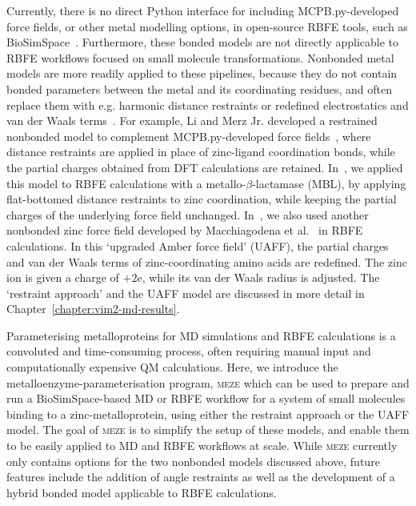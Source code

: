 Currently, there is no direct Python interface for including MCPB.py-developed force fields, or other metal modelling options, in open-source RBFE tools, such as BioSimSpace~\cite{hedges_biosimspace_2019}. Furthermore, these bonded models are not directly applicable to RBFE workflows focused on small molecule transformations. Nonbonded metal models are more readily applied to these pipelines, because they do not contain bonded parameters between the metal and its coordinating residues, and often replace them with e.g. harmonic distance restraints or redefined electrostatics and van der Waals terms~\cite{peters_structural_2010}. For example, Li and Merz Jr. developed a restrained nonbonded model to complement MCPB.py-developed force fields~\cite{li_building_2015}, where distance restraints are applied in place of zinc-ligand coordination bonds, while the partial charges obtained from DFT calculations are retained. In~\cite{guven_protocols_2024}, we applied this model to RBFE calculations with a metallo-$\beta$-lactamase (MBL), by applying flat-bottomed distance restraints to zinc coordination, while keeping the partial charges of the underlying force field unchanged. In~\cite{guven_protocols_2024}, we also used another nonbonded zinc force field developed by Macchiagodena et al.~\cite{macchiagodena_upgrading_2019,macchiagodena_upgraded_2020} in RBFE calculations. In this `upgraded Amber force field' (UAFF), the partial charges and van der Waals terms of zinc-coordinating amino acids are redefined. The zinc ion is given a charge of $+2$e, while its van der Waals radius is adjusted. The `restraint approach' and the UAFF model are discussed in more detail in Chapter~\ref{chapter:vim2-md-results}.

Parameterising metalloproteins for MD simulations and RBFE calculations is a convoluted and time-consuming process, often requiring manual input and computationally expensive QM calculations. Here, we introduce the metalloenzyme-parameterisation program, \textsc{meze} which can be used to prepare and run a BioSimSpace-based MD or RBFE workflow for a system of small molecules binding to a zinc-metalloprotein, using either the restraint approach or the UAFF model. The goal of \textsc{meze} is to simplify the setup of these models, and enable them to be easily applied to MD and RBFE workflows at scale. While \textsc{meze} currently only contains options for the two nonbonded models discussed above, future features include the addition of angle restraints as well as the development of a hybrid bonded model applicable to RBFE calculations.

